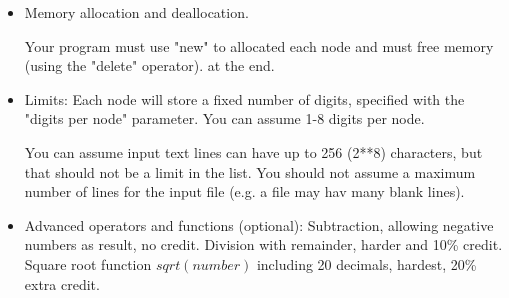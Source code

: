 \begin{itemize}
\item Memory allocation and deallocation.

Your program must use "new" to allocated each node and must free memory (using the "delete" operator).
at the end.


\item Limits:
Each node will store a fixed number of digits, specified with the "digits per node" parameter.
You can assume 1-8 digits per node.

You can assume input text lines can have up to 256 (2**8) characters,
but that should not be a limit in the list.
You should not assume a maximum number of lines for the input file 
(e.g. a file may hav many blank lines).

\item Advanced operators and functions (optional):
Subtraction, allowing negative numbers as result, no credit.
Division with remainder, harder and 10\% credit.
Square root function $sqrt(number)$ including 20 decimals, hardest, 20\% extra credit.


\end{itemize}


% 



